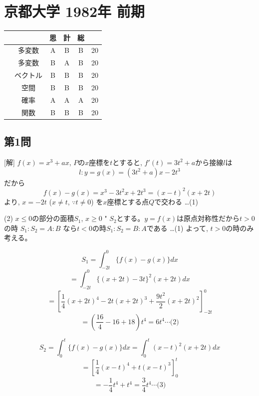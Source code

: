 \documentclass[../main.tex]{subfiles}
\begin{document}
\section*{京都大学 1982年 前期}
\begin{center}
  \begin{tabular}{|c|c|c|c|c|c|}
    \hline
    & & 思 & 計 & 総 & \\
    \hline
    [1] & 多変数 & A & B & B & 20 \\
    \hline
    [2] & 多変数 & B & A & B & 20 \\
    \hline
    [3] & ベクトル & B & B & B & 20 \\
    \hline
    [4] & 空間 & B & B & B & 20 \\
    \hline
    [5] & 確率 & A & A & A & 20 \\
    \hline
    [6] & 関数 & B & B & B & 20 \\
    \hline
  \end{tabular}
\end{center}

\subsection*{第1問}
[解] $f(x) = x^3 + ax$, $P$の$x$座標を$t$とすると, $f'(t) = 3t^2 + a$から接線$l$は
$$ l: y = g(x) = (3t^2 + a)x - 2t^3 $$
だから
$$ f(x) - g(x) = x^3 - 3t^2x + 2t^3 = (x-t)^2(x+2t) $$
より, $x = -2t$ ($x \neq t$, $\because t \neq 0$) を$x$座標とする点$Q$で交わる \dots (1)

(2) $x \le 0$の部分の面積$S_1$, $x \ge 0$ " $S_2$とする。$y = f(x)$は原点対称性だから$t>0$の時 $S_1 : S_2 = A : B$ なら$t<0$の時$S_1 : S_2 = B : A$である \dots (1)
よって, $t>0$の時のみ考える。

$$ S_1 = \int_{-2t}^0 \{ f(x) - g(x) \} dx $$
$$ = \int_{-2t}^0 \{ (x+2t) - 3t \}^2 (x+2t) dx $$
$$ = \left[ \frac{1}{4} (x+2t)^4 - 2t(x+2t)^3 + \frac{9t^2}{2} (x+2t)^2 \right]_{-2t}^0 $$
$$ = \left( \frac{16}{4} - 16 + 18 \right) t^4 = 6t^4 \cdots \text{(2)} $$

$$ S_2 = \int_0^t \{ f(x) - g(x) \} dx = \int_0^t (x-t)^2 (x+2t) dx $$
$$ = \left[ \frac{1}{4} (x-t)^4 + t (x-t)^3 \right]_0^t $$
$$ = -\frac{1}{4} t^4 + t^4 = \frac{3}{4} t^4 \cdots \text{(3)} $$
\end{document}
